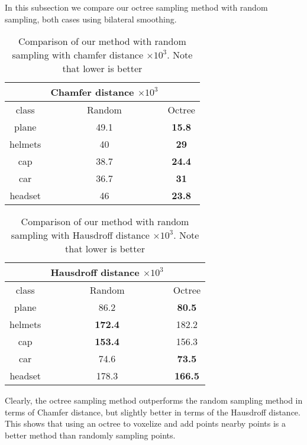 In this subsection we compare our octree sampling method with random sampling, both cases using bilateral smoothing.

\begin{table}[H]
\centering
\begin{tabular}{ccc}
	& Chamfer distance $\times 10^3$ &\\
	\hline
	class & Random & Octree \\
	\hline
	plane & {49.1} & \textbf{15.8} \\ 
	helmets & {40} & \textbf{29} \\
	cap & {38.7} & \textbf{24.4} \\  
	car & {36.7} & \textbf{31} \\  
	headset & {46} & \textbf{23.8}  \\
\end{tabular}
\caption{Comparison of our method with random sampling with chamfer distance $\times 10^3$. Note that lower is better}
\end{table}

\begin{table}[H]
\centering
\begin{tabular}{ccc}
	& Hausdroff distance $\times 10^3$ &\\
	\hline
	class & Random & Octree \\
	\hline
	plane & 86.2 & \textbf{80.5} \\
	helmets & \textbf{172.4} &  {182.2}\\
cap & \textbf{153.4} & {156.3} \\
car & {74.6} & \textbf{73.5} \\
headset & 178.3 & \textbf{166.5} \\
\end{tabular}
\caption{Comparison of our method with random sampling with Hausdroff distance $\times 10^3$. Note that lower is better}
\end{table}

Clearly, the octree sampling method outperforms the random sampling method in terms of Chamfer distance, but slightly better in terms of the Hausdroff distance.
This shows that using an octree to voxelize and add points nearby points is a better method than randomly sampling points.
